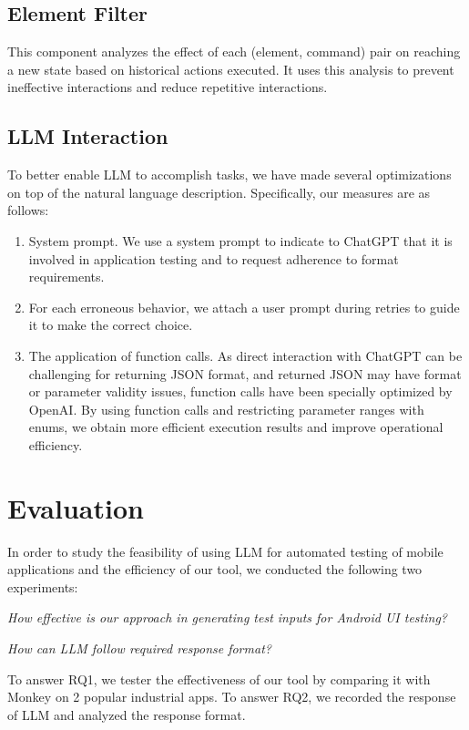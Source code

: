 \documentclass[conference]{IEEEtran}
\begin{document}
\subsection{Element Filter}
This component analyzes the effect of each (element, command) pair on reaching a new state based on historical actions executed. It uses this analysis to prevent ineffective interactions and reduce repetitive interactions.

\subsection{LLM Interaction}
To better enable LLM to accomplish tasks, we have made several optimizations on top of the natural language description. Specifically, our measures are as follows:
\begin{enumerate}
  \item System prompt. We use a system prompt to indicate to ChatGPT that it is involved in application testing and to request adherence to format requirements.
  \item For each erroneous behavior, we attach a user prompt during retries to guide it to make the correct choice.
  \item The application of function calls. As direct interaction with ChatGPT can be challenging for returning JSON format, and returned JSON may have format or parameter validity issues, function calls have been specially optimized by OpenAI. By using function calls and restricting parameter ranges with enums, we obtain more efficient execution results and improve operational efficiency.
\end{enumerate}

\section{Evaluation}

In order to study the feasibility of using LLM for automated testing of mobile applications and the efficiency of our tool, we conducted the following two experiments:


\begin{researchquestions}
    \item \textit{How effective is our approach in generating test inputs for Android UI testing?}
    \item \textit{How can LLM follow required response format?}
\end{researchquestions}
To answer RQ1, we tester the effectiveness of our tool by comparing it with Monkey on 2 popular industrial apps.
To answer RQ2, we recorded the response of LLM and analyzed the response format.
\end{document}
